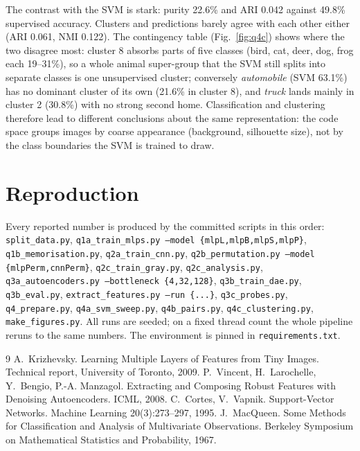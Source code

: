 \documentclass[10pt,twocolumn,letterpaper]{article}
\begin{document}
The contrast with the SVM is stark: purity 22.6\% and ARI 0.042 against 49.8\% supervised accuracy.
Clusters and predictions barely agree with each other either (ARI 0.061, NMI 0.122).
The contingency table (Fig.~\ref{fig:q4c}) shows where the two disagree most: cluster 8 absorbs parts of five classes (bird, cat, deer, dog, frog each 19--31\%), so a whole animal super-group that the SVM still splits into separate classes is one unsupervised cluster; conversely \emph{automobile} (SVM 63.1\%) has no dominant cluster of its own (21.6\% in cluster 8), and \emph{truck} lands mainly in cluster 2 (30.8\%) with no strong second home.
Classification and clustering therefore lead to different conclusions about the same representation: the code space groups images by coarse appearance (background, silhouette size), not by the class boundaries the SVM is trained to draw.

\section{Reproduction}
Every reported number is produced by the committed scripts in this order:
\texttt{split\_data.py}, \texttt{q1a\_train\_mlps.py --model \{mlpL,mlpB,mlpS,mlpP\}}, \texttt{q1b\_memorisation.py}, \texttt{q2a\_train\_cnn.py}, \texttt{q2b\_permutation.py --model \{mlpPerm,cnnPerm\}}, \texttt{q2c\_train\_gray.py}, \texttt{q2c\_analysis.py}, \texttt{q3a\_autoencoders.py --bottleneck \{4,32,128\}}, \texttt{q3b\_train\_dae.py}, \texttt{q3b\_eval.py}, \texttt{extract\_features.py --run \{...\}}, \texttt{q3c\_probes.py}, \texttt{q4\_prepare.py}, \texttt{q4a\_svm\_sweep.py}, \texttt{q4b\_pairs.py}, \texttt{q4c\_clustering.py}, \texttt{make\_figures.py}.
All runs are seeded; on a fixed thread count the whole pipeline reruns to the same numbers. The environment is pinned in \texttt{requirements.txt}.

{\small
\begin{thebibliography}{9}
 A.~Krizhevsky. Learning Multiple Layers of Features from Tiny Images. Technical report, University of Toronto, 2009.
 P.~Vincent, H.~Larochelle, Y.~Bengio, P.-A. Manzagol. Extracting and Composing Robust Features with Denoising Autoencoders. ICML, 2008.
 C.~Cortes, V.~Vapnik. Support-Vector Networks. Machine Learning 20(3):273--297, 1995.
 J.~MacQueen. Some Methods for Classification and Analysis of Multivariate Observations. Berkeley Symposium on Mathematical Statistics and Probability, 1967.
\end{thebibliography}
}
\end{document}
